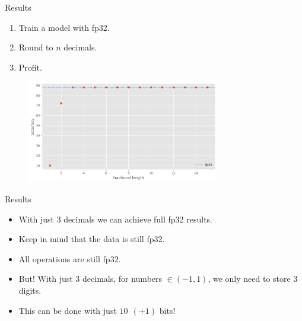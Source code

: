 \documentclass[aspectratio=169]{beamer} %
\begin{document}
\begin{frame}{Results}
  \begin{enumerate}
    \item Train a model with fp32.
    \item Round to $n$ decimals.
    \item Profit.
  \end{enumerate}

  \begin{figure}
    \centering  
    \includegraphics[width=0.75\textwidth]{figures/118_accuracy.png}
  \end{figure}
\end{frame}

\begin{frame}{Results}
  \begin{itemize}
    \item With just 3 decimals we can achieve full fp32 results.
    \item Keep in mind that the data is still fp32.
    \item All operations are still fp32.

    \pause
    \bigskip
    
    \item But! With just 3 decimals, for numbers $\in (-1, 1)$, we only need to store 3 digits.
    \item This can be done with just $10~~(+1)$ bits!
  \end{itemize}
\end{frame}

\end{document}
